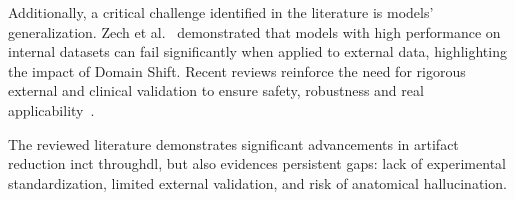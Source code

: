 Additionally, a critical challenge identified in the literature is models' generalization. Zech et al.~\cite{zechVariableGeneralizationPerformance2018} demonstrated that models with high performance on internal datasets can fail significantly when applied to external data, highlighting the impact of Domain Shift. Recent reviews reinforce the need for rigorous external and clinical validation to ensure safety, robustness and real applicability~\cite{willeminkPreparingMedicalImaging2020,kellyKeyChallengesDelivering2019}. 

The reviewed literature demonstrates significant advancements in artifact reduction in\acrshort{ct} through\acrshort{dl}, but also evidences persistent gaps: lack of experimental standardization, limited external validation, and risk of anatomical hallucination.
